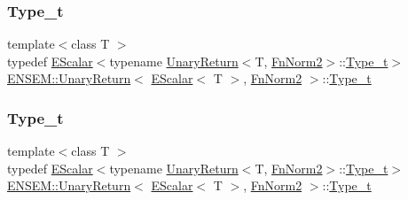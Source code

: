 \subsubsection{\texorpdfstring{Type\_t}{Type\_t}\hspace{0.1cm}{\footnotesize\ttfamily [1/3]}}
{\footnotesize\ttfamily template$<$class T $>$ \\
typedef \mbox{\hyperlink{classENSEM_1_1EScalar}{E\+Scalar}}$<$typename \mbox{\hyperlink{structENSEM_1_1UnaryReturn}{Unary\+Return}}$<$T, \mbox{\hyperlink{structENSEM_1_1FnNorm2}{Fn\+Norm2}}$>$\+::\mbox{\hyperlink{structENSEM_1_1UnaryReturn_3_01EScalar_3_01T_01_4_00_01FnNorm2_01_4_acb54ade58c6e4e3f443f349d5ddb92e1}{Type\+\_\+t}}$>$ \mbox{\hyperlink{structENSEM_1_1UnaryReturn}{E\+N\+S\+E\+M\+::\+Unary\+Return}}$<$ \mbox{\hyperlink{classENSEM_1_1EScalar}{E\+Scalar}}$<$ T $>$, \mbox{\hyperlink{structENSEM_1_1FnNorm2}{Fn\+Norm2}} $>$\+::\mbox{\hyperlink{structENSEM_1_1UnaryReturn_3_01EScalar_3_01T_01_4_00_01FnNorm2_01_4_acb54ade58c6e4e3f443f349d5ddb92e1}{Type\+\_\+t}}}

\mbox{\label{structENSEM_1_1UnaryReturn_3_01EScalar_3_01T_01_4_00_01FnNorm2_01_4_acb54ade58c6e4e3f443f349d5ddb92e1}} 
\subsubsection{\texorpdfstring{Type\_t}{Type\_t}\hspace{0.1cm}{\footnotesize\ttfamily [2/3]}}
{\footnotesize\ttfamily template$<$class T $>$ \\
typedef \mbox{\hyperlink{classENSEM_1_1EScalar}{E\+Scalar}}$<$typename \mbox{\hyperlink{structENSEM_1_1UnaryReturn}{Unary\+Return}}$<$T, \mbox{\hyperlink{structENSEM_1_1FnNorm2}{Fn\+Norm2}}$>$\+::\mbox{\hyperlink{structENSEM_1_1UnaryReturn_3_01EScalar_3_01T_01_4_00_01FnNorm2_01_4_acb54ade58c6e4e3f443f349d5ddb92e1}{Type\+\_\+t}}$>$ \mbox{\hyperlink{structENSEM_1_1UnaryReturn}{E\+N\+S\+E\+M\+::\+Unary\+Return}}$<$ \mbox{\hyperlink{classENSEM_1_1EScalar}{E\+Scalar}}$<$ T $>$, \mbox{\hyperlink{structENSEM_1_1FnNorm2}{Fn\+Norm2}} $>$\+::\mbox{\hyperlink{structENSEM_1_1UnaryReturn_3_01EScalar_3_01T_01_4_00_01FnNorm2_01_4_acb54ade58c6e4e3f443f349d5ddb92e1}{Type\+\_\+t}}}

